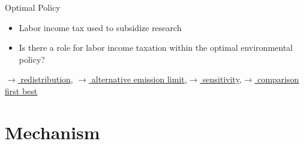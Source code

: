 \documentclass[11pt,aspectratio=169]{beamer}
\begin{document}
\begin{frame}{Optimal Policy}
\begin{figure}[h!!]
\begin{subfigure}{0.45\textwidth}
			\end{subfigure}
		\end{figure}
		\vspace{3mm}
		\pause
		\begin{block}{}
			\begin{itemize}
				\item Labor income tax used to subsidize research
				\item Is there a role for labor income taxation within the optimal environmental policy?
			\end{itemize}
		\end{block}	
		\hypertarget{backOPT}{}
		\vspace{-4mm}
		\hfill
		
		\hyperlink{Redis}{\tiny{$\rightarrow$ redistribution,}}
		\hyperlink{altems}{\tiny{$\rightarrow$ alternative emission limit,}}\hyperlink{sensphi}{\tiny{$\rightarrow$ sensitivity,}}\hyperlink{compfb}{\tiny{$\rightarrow$ comparison first best}}
	\end{frame}
	
	
	\section*{Mechanism}
	
\end{document}
